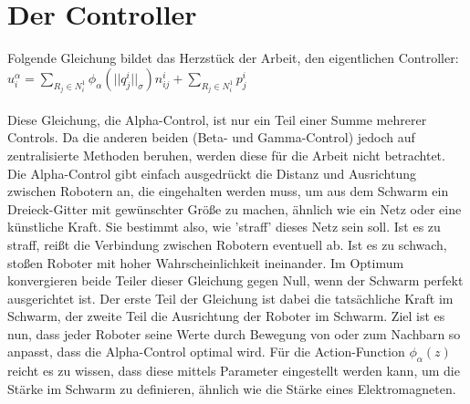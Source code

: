 \section{Der Controller}

Folgende Gleichung bildet das Herzstück der Arbeit, den eigentlichen Controller:\\

$u_i^\alpha=\sum\limits_{R_j\in N_i^1}\phi_\alpha(||q_j^i||_\sigma)n_{ij}^i+
\sum\limits_{R_j\in N_i^1}p_j^i$\\\\
Diese Gleichung, die Alpha-Control, ist nur ein Teil einer Summe mehrerer Controls. Da die anderen beiden
(Beta- und Gamma-Control) jedoch auf zentralisierte Methoden beruhen, werden diese für die Arbeit nicht
betrachtet. Die Alpha-Control gibt einfach ausgedrückt die Distanz und Ausrichtung zwischen Robotern an,
die eingehalten werden muss, um aus dem Schwarm ein Dreieck-Gitter mit gewünschter Größe zu machen, 
ähnlich wie ein Netz oder eine künstliche Kraft. Sie bestimmt also, wie 'straff' dieses Netz sein soll. 
Ist es zu straff, reißt die Verbindung zwischen Robotern eventuell ab. Ist es zu schwach, stoßen Roboter 
mit hoher Wahrscheinlichkeit ineinander. Im Optimum konvergieren beide Teiler dieser Gleichung gegen 
Null, wenn der Schwarm perfekt ausgerichtet ist. Der erste Teil der Gleichung ist dabei die tatsächliche
Kraft im Schwarm, der zweite Teil die Ausrichtung der Roboter im Schwarm. Ziel ist es nun, dass jeder
Roboter seine Werte durch Bewegung von oder zum Nachbarn so anpasst, dass die Alpha-Control optimal wird.
Für die Action-Function $\phi_\alpha(z)$ reicht es zu wissen, dass diese mittels Parameter eingestellt
werden kann, um die Stärke im Schwarm zu definieren, ähnlich wie die Stärke eines Elektromagneten.